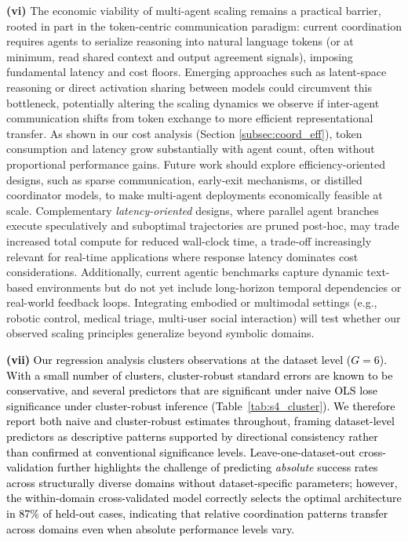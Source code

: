 \textbf{(vi)} The economic viability of multi-agent scaling remains a practical barrier, rooted in part in the token-centric communication paradigm: current coordination requires agents to serialize reasoning into natural language tokens (or at minimum, read shared context and output agreement signals), imposing fundamental latency and cost floors. Emerging approaches such as latent-space reasoning or direct activation sharing between models could circumvent this bottleneck, potentially altering the scaling dynamics we observe if inter-agent communication shifts from token exchange to more efficient representational transfer. As shown in our cost analysis (Section \ref{subsec:coord_eff}), token consumption and latency grow substantially with agent count, often without proportional performance gains. Future work should explore efficiency-oriented designs, such as sparse communication, early-exit mechanisms, or distilled coordinator models, to make multi-agent deployments economically feasible at scale. Complementary \emph{latency-oriented} designs, where parallel agent branches execute speculatively and suboptimal trajectories are pruned post-hoc, may trade increased total compute for reduced wall-clock time, a trade-off increasingly relevant for real-time applications where response latency dominates cost considerations. Additionally, current agentic benchmarks capture dynamic text-based environments but do not yet include long-horizon temporal dependencies or real-world feedback loops. Integrating embodied or multimodal settings (e.g., robotic control, medical triage, multi-user social interaction) will test whether our observed scaling principles generalize beyond symbolic domains.

\textcolor{black}{\textbf{(vii)} Our regression analysis clusters observations at the dataset level ($G=6$). With a small number of clusters, cluster-robust standard errors are known to be conservative, and several predictors that are significant under naive OLS lose significance under cluster-robust inference (Table~\ref{tab:s4_cluster}). We therefore report both naive and cluster-robust estimates throughout, framing dataset-level predictors as descriptive patterns supported by directional consistency rather than confirmed at conventional significance levels. Leave-one-dataset-out cross-validation further highlights the challenge of predicting \emph{absolute} success rates across structurally diverse domains without dataset-specific parameters; however, the within-domain cross-validated model correctly selects the optimal architecture in 87\% of held-out cases, indicating that relative coordination patterns transfer across domains even when absolute performance levels vary.}